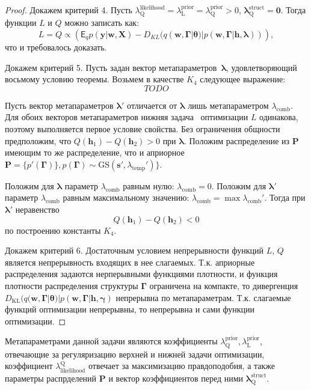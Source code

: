 \begin{proof}
Докажем критерий 4. Пусть $\lambda^\text{likelihood}_\text{Q} = \lambda^\text{prior}_\text{L} = \lambda^\text{prior}_\text{Q} > 0$, $\boldsymbol{\lambda}^\text{struct}_\text{Q} = \mathbf{0}$. Тогда функции $L$ и $Q$  можно записать как: $$L = Q \propto \left(\mathsf{E}_q p(\mathbf{y}|\mathbf{w}, \mathbf{X})-{D}_{KL}(q(\mathbf{w}, \boldsymbol{\Gamma}|\boldsymbol{\theta})|p(\mathbf{w}, \boldsymbol{\Gamma}|\mathbf{h}, \boldsymbol{\lambda}))\right),$$ что и требовалось доказать.

Докажем критерий 5. 
Пусть задан вектор метапараметров~$\boldsymbol{\lambda}$, удовлетворяющий восьмому условию теоремы. 
Возьмем в качестве $K_4$ следующее выражение:
\[
TODO
\]

Пусть вектор метапараметров $\boldsymbol{\lambda}'$ отличается от $\boldsymbol{\lambda}$ лишь метапараметром $\lambda_\text{comb}$. Для  обоих векторов метапараметров нижняя задача  оптимизации $L$ одинакова, поэтому выполняется первое условие свойства.
Без ограничения общности предположим, что $Q(\mathbf{h}_1)-Q(\mathbf{h}_2) > 0$ при $\boldsymbol{\lambda}.$
Положим распределение из $\mathbf{P}$ имеющим то же распределение, что и априорное $\mathbf{P} = \{p'(\boldsymbol{\Gamma})\}, p(\boldsymbol{\Gamma}) \sim \text{GS}(\mathbf{s}', \lambda_\text{temp}')\}$. 

Положим для $\boldsymbol{\lambda}$ параметр $\lambda_\text{comb}$ равным нулю: $\lambda_\text{comb} = 0$.
Положим для $\boldsymbol{\lambda}'$ параметр $\lambda_\text{comb}$ равным максимальному значению: $\lambda_\text{comb} = \max \lambda_\text{comb}'$.
Тогда при $\boldsymbol{\lambda}'$ неравенство 
\[
Q(\mathbf{h}_1)-Q(\mathbf{h}_2) < 0 
\]
по построению константы $K_4$.

Докажем критерий 6. Достаточным условием непрерывности функций $L$, $Q$ является непрерывность входящих в нее слагаемых. 
Т.к. априорные распределения задаются нерперывными функциями плотности, и функция плотности распределения структуры $\boldsymbol{\Gamma}$ ограничена на компакте, то дивергенция $D_\text{KL}(q(\mathbf{w}, \boldsymbol{\Gamma}|\boldsymbol{\theta})|p(\mathbf{w}, \boldsymbol{\Gamma}|\mathbf{h},\boldsymbol{\gamma})$ непрерывна по метапараметрам. Т.к. слагаемые функций оптимизации непрерывны, то непрерывна и сами функции оптимизации.
\end{proof}

Метапараметрами данной задачи являются коэффициенты $\lambda^\text{prior}_\text{Q}, \lambda^\text{prior}_\text{L}$, отвечающие за регуляризацию верхней и нижней задачи оптимизации, коэффициент $\lambda_\text{likelihood}^\text{Q}$ отвечает за максимизацию правдоподобия, а также параметры распрделений $\mathbf{P}$ и вектор коэффициентов перед ними $\boldsymbol{\lambda}^\text{struct}_\text{Q}$. 

